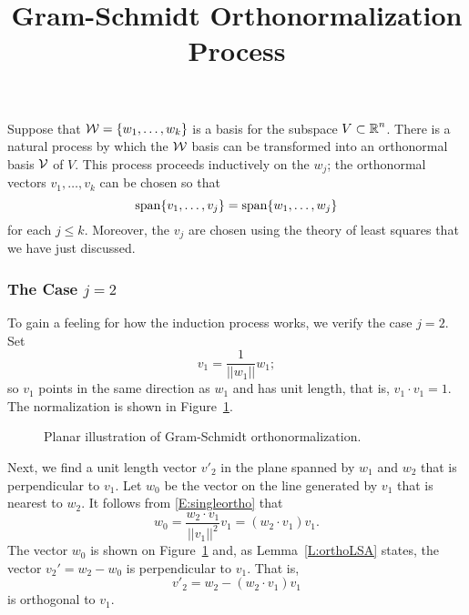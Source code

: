 \documentclass{ximera}
\title{Gram-Schmidt Orthonormalization Process}
\begin{document}
\begin{abstract}
\end{abstract}
\maketitle

  \label{S:GSO}


Suppose that ${\cal W} = \{w_1,\ldots,w_k\}$ is a basis for the subspace
$V\subset\mbox{$\mathbb{R}$}^n$.  There is a natural process by which the ${\cal W}$ basis
can be transformed into an
orthonormal basis
${\cal V}$ of $V$.  This
process proceeds inductively on the $w_j$; the orthonormal vectors
$v_1,\ldots,v_k$ can be chosen so that
\[
{\rm span}\{v_1,\ldots,v_j\} = {\rm span}\{w_1,\ldots,w_j\}
\]
for each $j\leq k$.  Moreover, the $v_j$ are chosen using the theory of
least squares that we have just discussed.

\subsubsection*{The Case $j=2$}

To gain a feeling for how the induction process works, we verify the case
$j=2$.  Set
\begin{equation}  \label{E:ortho1}
v_1 = \frac{1}{||w_1||}w_1;
\end{equation}
so $v_1$ points in the same direction as $w_1$ and has unit length, that is,
$v_1\cdot v_1=1$.  The normalization is shown in Figure~\ref{F:gram}.

\begin{figure}[htb]
        \centerline{%
        }
        \caption{Planar illustration of Gram-Schmidt orthonormalization.}
        \label{F:gram}
\end{figure}

Next, we find a unit length vector $v'_2$ in the plane spanned by $w_1$ and
$w_2$ that is perpendicular
to $v_1$. Let $w_0$ be the vector on the line
generated by $v_1$ that is nearest to $w_2$.  It follows from
\eqref{E:singleortho} that
\[
w_0 = \frac{w_2\cdot v_1}{||v_1||^2}v_1 = (w_2\cdot v_1) v_1.
\]
The vector $w_0$ is shown on Figure~\ref{F:gram} and, as
Lemma~\ref{L:orthoLSA} states, the vector $v_2'=w_2-w_0$ is perpendicular to
$v_1$. That is,
\begin{equation}  \label{E:ortho2}
v'_2 = w_2 - (w_2\cdot v_1) v_1
\end{equation}
is orthogonal to $v_1$.
\end{document}
